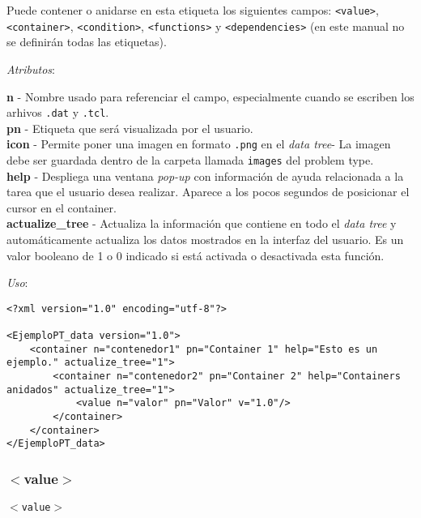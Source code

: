 \documentclass[10pt, a4paper, twocolumn]{article}
\begin{document}
Puede contener o anidarse en esta etiqueta los siguientes campos: \texttt{<value>}, \texttt{<container>}, \texttt{<condition>}, \texttt{<functions>} y \texttt{<dependencies>} (en este manual no se definirán todas las etiquetas).

\vspace{0.15cm}
\textit{Atributos}:

\vspace{0.15cm}
	\textbf{n} - Nombre usado para referenciar el campo, especialmente cuando se escriben los arhivos \texttt{.dat} y \texttt{.tcl}.\\
	\textbf{pn} - Etiqueta que será visualizada por el usuario.\\
	\textbf{icon} - Permite poner una imagen en formato \texttt{.png} en el \textit{data tree}- La imagen debe ser guardada dentro de la carpeta llamada \texttt{images} del problem type.\\
	\textbf{help} - Despliega una ventana \textit{pop-up} con información de ayuda relacionada a la tarea que el usuario desea realizar. Aparece a los pocos segundos de posicionar el cursor en el container.\\
	\textbf{actualize\_tree} - Actualiza la información que contiene en todo el \textit{data tree} y automáticamente actualiza los datos mostrados en la interfaz del usuario. Es un valor booleano de 1 o 0 indicado si está activada o desactivada esta función.
\vspace{0.15cm}

\textit{Uso}:
\vspace{0.15cm}

\lstset{language=XML} 
\begin{lstlisting}[caption={Ejemplo de <container> anidados.}]
<?xml version="1.0" encoding="utf-8"?>

<EjemploPT_data version="1.0">
	<container n="contenedor1" pn="Container 1" help="Esto es un ejemplo." actualize_tree="1">
		<container n="contenedor2" pn="Container 2" help="Containers anidados" actualize_tree="1">
			<value n="valor" pn="Valor" v="1.0"/>
		</container>
	</container>
</EjemploPT_data>
\end{lstlisting}

\subsubsection{$<$value$>$}
\label{subsubsec:value}
\vspace{0.20cm}
\begin{center}
	\texttt{$<$value$>$}
\end{center}
\vspace{0.20cm}
\end{document}
